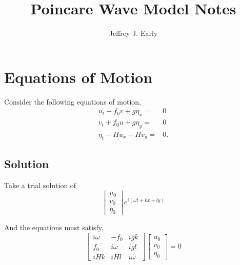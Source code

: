 \documentclass[11pt]{article}
\title{Poincare Wave Model Notes}
\author{Jeffrey J. Early}
\begin{document}
\maketitle

%
%
\section{Equations of Motion}
%
%



Consider the following equations of motion,
\begin{align}
u_t  -f_0 v + g\eta_x =& 0 \\
v_t + f_0 u + g\eta_y =& 0 \\
\eta_t - H u_x - H v_y =&0.
\end{align}

%
\subsection{Solution}
%

Take a trial solution of
\begin{equation}
\left[\begin{array}{c}u_0 \\v_0 \\ \eta_0\end{array}\right]
e^{i(\omega t + kx + ly)}
\end{equation}

And the equations must satisfy,
\begin{equation}
\left[\begin{array}{ccc}
i\omega & -f_0 & igk \\
 f_0  & i\omega  & igl \\
i H k & i H l & i\omega
\end{array}\right]
\left[\begin{array}{c}u_0 \\v_0 \\ \eta_0\end{array}\right]
=0
\end{equation}
\end{document}
